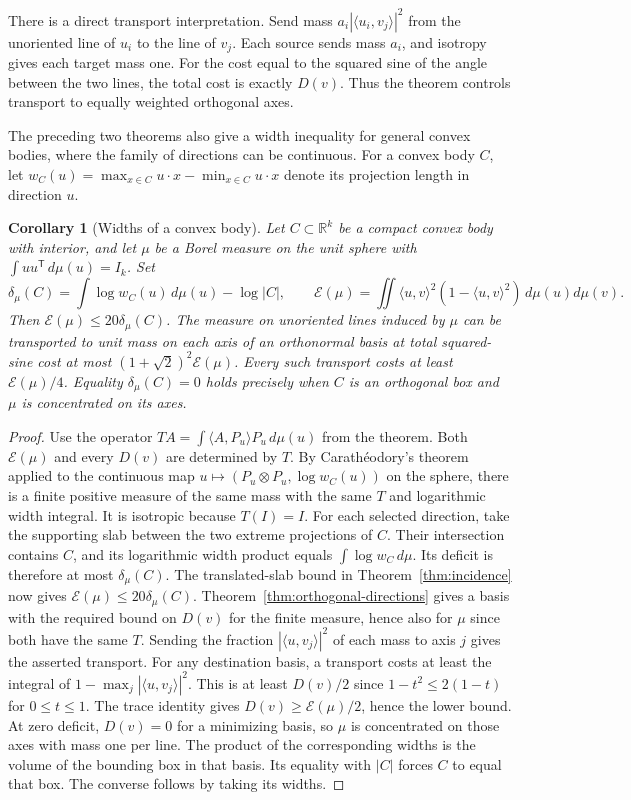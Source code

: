 \documentclass[11pt,a4paper]{article}
\newtheorem{corollary}[theorem]{Corollary}
\theoremstyle{remark}\newtheorem{remark}[theorem]{Remark}
\numberwithin{equation}{section}
\begin{document}
There is a direct transport interpretation. Send mass
\(a_i|\langle u_i,v_j\rangle|^2\) from the unoriented line of \(u_i\)
to the line of \(v_j\). Each source sends mass \(a_i\), and isotropy
gives each target mass one. For the cost equal to the squared sine
of the angle between the two lines, the total cost is exactly \(D(v)\).
Thus the theorem controls transport to equally weighted orthogonal axes.

The preceding two theorems also give a width inequality for general
convex bodies, where the family of directions can be continuous.
For a convex body \(C\), let \(w_C(u)=\max_{x\in C}u\cdot x-
\min_{x\in C}u\cdot x\) denote its projection length in direction \(u\).

\begin{corollary}[Widths of a convex body]\label{cor:widths}
Let \(C\subset\mathbb R^k\) be a compact convex body with interior,
and let \(\mu\) be a Borel measure on the unit sphere with
\(\int uu^{\mathsf T}\,d\mu(u)=I_k\). Set
\[
 \delta_\mu(C)=\int\log w_C(u)\,d\mu(u)-\log|C|,\qquad
 \mathcal E(\mu)=\iint \langle u,v\rangle^2
 (1-\langle u,v\rangle^2)\,d\mu(u)d\mu(v).
\]
Then \(\mathcal E(\mu)\le20\delta_\mu(C)\).
The measure on unoriented lines induced by \(\mu\) can be transported
to unit mass on each axis of an orthonormal basis at total squared-sine
cost at most \((1+\sqrt2)^2\mathcal E(\mu)\). Every such transport costs
at least \(\mathcal E(\mu)/4\).
Equality \(\delta_\mu(C)=0\) holds precisely when \(C\) is an
orthogonal box and \(\mu\) is concentrated on its axes.
\end{corollary}
\begin{proof}
Use the operator \(TA=\int\langle A,P_u\rangle P_u\,d\mu(u)\)
from the theorem. Both \(\mathcal E(\mu)\) and every \(D(v)\) are
determined by \(T\). By Carath\'eodory's theorem applied to the
continuous map \(u\mapsto(P_u\otimes P_u,\log w_C(u))\) on the
sphere, there is a finite positive measure of the same mass with
the same \(T\) and logarithmic width integral. It is isotropic because
\(T(I)=I\). For each selected direction, take the supporting slab
between the two extreme projections of \(C\). Their intersection
contains \(C\), and its logarithmic width product equals
\(\int\log w_C\,d\mu\). Its deficit is therefore at most
\(\delta_\mu(C)\). The translated-slab bound in
Theorem~\ref{thm:incidence} now gives
\(\mathcal E(\mu)\le20\delta_\mu(C)\).
Theorem~\ref{thm:orthogonal-directions} gives a basis with the required
bound on \(D(v)\) for the finite measure, hence also for \(\mu\) since
both have the same \(T\). Sending the fraction
\(|\langle u,v_j\rangle|^2\) of each mass to axis \(j\) gives the
asserted transport.
For any destination basis, a transport costs at least the integral of
\(1-\max_j|\langle u,v_j\rangle|^2\). This is at least \(D(v)/2\)
since \(1-t^2\le2(1-t)\) for \(0\le t\le1\). The trace identity gives \(D(v)\ge\mathcal E(\mu)/2\), hence the lower bound. At zero deficit, \(D(v)=0\) for a minimizing
basis, so \(\mu\) is concentrated on those axes with mass one per line.
The product of the corresponding widths is the volume of the bounding
box in that basis. Its equality with \(|C|\) forces \(C\) to equal that
box. The converse follows by taking its widths.
\end{proof}
\end{document}
